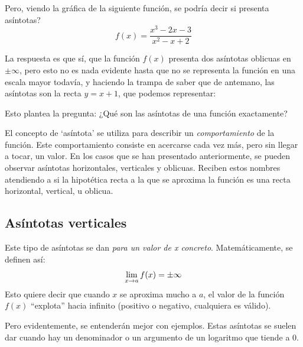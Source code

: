\documentclass[sans]{apuntes}
\begin{document}
Pero, viendo la gráfica de la siguiente función, se podría decir si presenta asíntotas?
\[f(x) = \frac{x^3 - 2x - 3}{x^2 - x + 2}\]
\begin{figure}[ht]
	\centering
\end{figure}

La respuesta es que sí, que la función $f(x)$ presenta dos asíntotas oblicuas en $\pm \infty$, pero esto no es nada evidente hasta que no se representa la función en una escala mayor todavía, y haciendo la trampa de saber que de antemano, las asíntotas son la recta $y = x + 1$, que podemos representar:

\begin{figure}[!ht]
	\centering
\end{figure}

Esto plantea la pregunta: ¿Qué son las asíntotas de una función exactamente?
\par El concepto de `asíntota' se utiliza para describir un \emph{comportamiento} de la función. Este comportamiento consiste en acercarse cada vez más, pero sin llegar a tocar, un valor. En los casos que se han presentado anteriormente, se pueden observar asíntotas horizontales, verticales y oblicuas. Reciben estos nombres atendiendo a si la hipotética recta a la que se aproxima la función es una recta horizontal, vertical, u oblicua.

\subsection{Asíntotas verticales}
Este tipo de asíntotas se dan \emph{para un valor de x concreto}. Matemáticamente, se definen así:
\[\displaystyle\lim_{x\to a} f(x) = \pm \infty\]
Esto quiere decir que cuando $x$ se aproxima mucho a $a$, el valor de la función $f(x)$ ``explota'' hacia infinito (positivo o negativo, cualquiera es válido).
\par Pero evidentemente, se entenderán mejor con ejemplos. Estas asíntotas se suelen dar cuando hay un denominador o un argumento de un logaritmo que tiende a 0.
\end{document}
